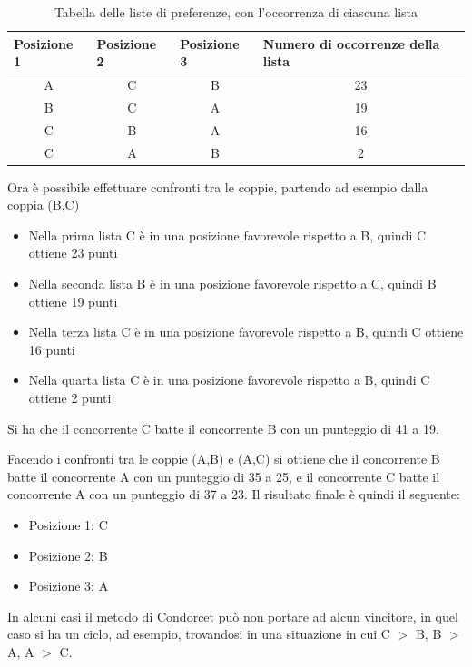 \documentclass[12pt,a4paper,openright,twoside]{book}
\begin{document}
\renewcommand{\arraystretch}{1.5}
\begin{table}[H]
    \centering
    \begin{tabular}{|c|c|c|c|}
    \hline
    \multicolumn{1}{|l|}{Posizione 1} & \multicolumn{1}{|l|}{Posizione 2} & \multicolumn{1}{|l|}{Posizione 3} & \multicolumn{1}{l|}{Numero di occorrenze della lista } \\ \hline
    A & C & B & 23                              \\ \hline
    B & C & A & 19                              \\ \hline
    C & B & A & 16                              \\ \hline
    C & A & B & 2                               \\ \hline
    \end{tabular}
    \caption{Tabella delle liste di preferenze, con l'occorrenza di ciascuna lista}
    \label{table:voticondorcet}
\end{table}

Ora è possibile effettuare confronti tra le coppie, partendo ad esempio dalla coppia (B,C)
\begin{itemize}
    \item{Nella prima lista C è in una posizione favorevole rispetto a B, quindi C ottiene 23 punti}
    \item{Nella seconda lista B è in una posizione favorevole rispetto a C, quindi B ottiene 19 punti}
    \item{Nella terza lista C è in una posizione favorevole rispetto a B, quindi C ottiene 16 punti}
    \item{Nella quarta lista C è in una posizione favorevole rispetto a B, quindi C ottiene 2 punti}
\end{itemize}

Si ha che il concorrente C batte il concorrente B con un punteggio di 41 a 19.

Facendo i confronti tra le coppie (A,B) e (A,C) si ottiene che il concorrente
B batte il concorrente A con un punteggio di 35 a 25, e il concorrente C batte il concorrente
A con un punteggio di 37 a 23. Il risultato finale è quindi il seguente:
\begin{itemize}
    \item{Posizione 1: C}
    \item{Posizione 2: B}
    \item{Posizione 3: A}
\end{itemize} 

In alcuni casi il metodo di Condorcet può non portare ad alcun vincitore, in quel caso si
ha un ciclo, ad esempio, trovandosi in una situazione 
in cui C $>$ B, B $>$ A, A $>$ C.
\end{document}
